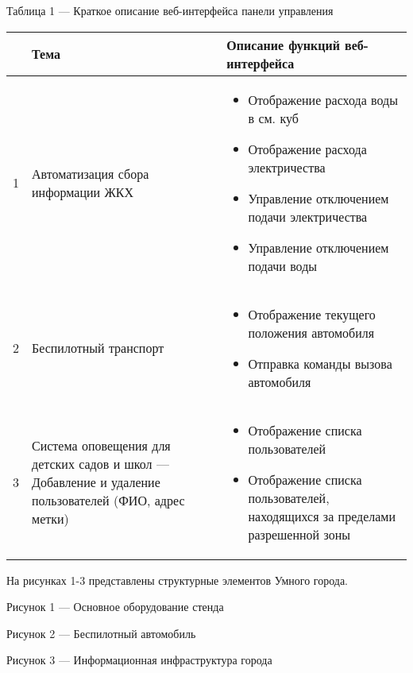 \begin{table}[H]
    Таблица 1 — Краткое описание веб-интерфейса панели управления
    \begin{tabular} {|c|p{6cm}|p{8cm}|}
        \hline
        & Тема & Описание функций веб-интерфейса \\
        \hline
        1 & Автоматизация сбора информации ЖКХ & 
        \begin{itemize}
            \item Отображение расхода воды в см. куб
            \item Отображение расхода электричества
            \item Управление отключением подачи электричества
            \item Управление отключением подачи воды                
        \end{itemize} \\
        \hline
        2 & Беспилотный транспорт &
        \begin{itemize}
            \item Отображение текущего положения автомобиля
            \item Отправка команды вызова автомобиля    
        \end{itemize} \\
        \hline
        3 & Система оповещения для детских садов и школ	— Добавление и удаление пользователей (ФИО, адрес метки) &
        \begin{itemize}
            \item Отображение списка пользователей
            \item Отображение списка пользователей, находящихся за пределами разрешенной зоны                
        \end{itemize}\\
        \hline
    \end{tabular}
\end{table}

На рисунках 1-3 представлены структурные элементов Умного города. 


\centerline{Рисунок 1 — Основное оборудование стенда}


\centerline{Рисунок 2 — Беспилотный автомобиль}


\centerline{Рисунок 3 — Информационная инфраструктура города}

